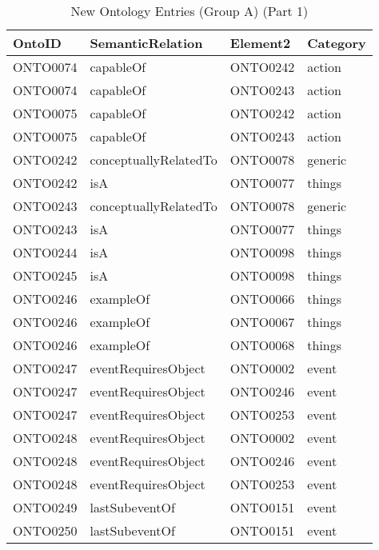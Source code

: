 \begin{table}[H]   %
\centering
\caption{New Ontology Entries (Group A) (Part 1)} \vspace{0.25em}
\begin{tabular}{|l|l|l|l|} \hline
\textbf{OntoID} & \textbf{SemanticRelation} & \textbf{Element2} & \textbf{Category} \\ \hline
ONTO0074 & capableOf & ONTO0242 & action \\ \hline
ONTO0074 & capableOf & ONTO0243 & action \\ \hline
ONTO0075 & capableOf & ONTO0242 & action \\ \hline
ONTO0075 & capableOf & ONTO0243 & action \\ \hline
ONTO0242 & conceptuallyRelatedTo & ONTO0078 & generic \\ \hline
ONTO0242 & isA & ONTO0077 & things \\ \hline
ONTO0243 & conceptuallyRelatedTo & ONTO0078 & generic \\ \hline
ONTO0243 & isA & ONTO0077 & things \\ \hline
ONTO0244 & isA & ONTO0098 & things \\ \hline
ONTO0245 & isA & ONTO0098 & things \\ \hline
ONTO0246 & exampleOf & ONTO0066 & things \\ \hline
ONTO0246 & exampleOf & ONTO0067 & things \\ \hline
ONTO0246 & exampleOf & ONTO0068 & things \\ \hline
ONTO0247 & eventRequiresObject & ONTO0002 & event \\ \hline
ONTO0247 & eventRequiresObject & ONTO0246 & event \\ \hline
ONTO0247 & eventRequiresObject & ONTO0253 & event \\ \hline
ONTO0248 & eventRequiresObject & ONTO0002 & event \\ \hline
ONTO0248 & eventRequiresObject & ONTO0246 & event \\ \hline
ONTO0248 & eventRequiresObject & ONTO0253 & event \\ \hline
ONTO0249 & lastSubeventOf & ONTO0151 & event \\ \hline
ONTO0250 & lastSubeventOf & ONTO0151 & event \\ \hline
\end{tabular}
\label{tab:grpaonto}
\end{table}

